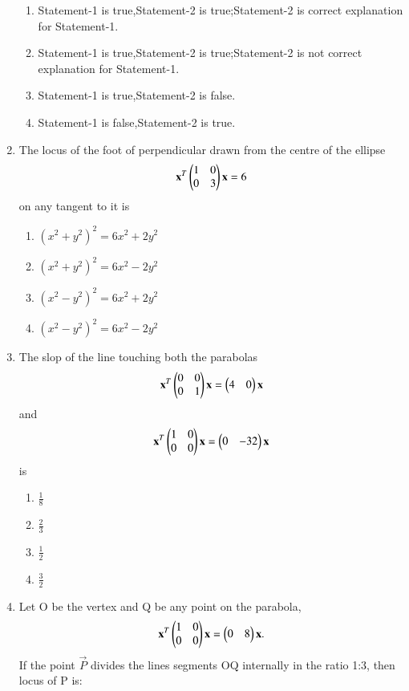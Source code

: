 \documentclass[journal,12pt,twocolumn]{IEEEtran}
\begin{document}
\begin{enumerate}[label=\arabic*]
    \begin{enumerate}
    \item Statement-1 is true,Statement-2 is true;Statement-2 is correct explanation for Statement-1.
    \item Statement-1 is true,Statement-2 is true;Statement-2 is not correct explanation for Statement-1.
    \item Statement-1 is true,Statement-2 is false.
    \item Statement-1 is false,Statement-2 is true.
    \end{enumerate}
    \item The locus of the foot of perpendicular drawn from the centre of the ellipse
    \begin{align}
    \mathbf{x}^T\begin{pmatrix}1&0\\0&3\end{pmatrix}\mathbf{x}=6
    \end{align} on any tangent to it is
    \begin{enumerate}
    \item $(x^2+y^2)^2=6x^2+2y^2$
    \item $(x^2+y^2)^2=6x^2-2y^2$
    \item $(x^2-y^2)^2=6x^2+2y^2$
    \item $(x^2-y^2)^2=6x^2-2y^2$
    \end{enumerate}
    \item The slop of the line touching both the parabolas 
    \begin{align}
    \mathbf{x}^T\begin{pmatrix}0&0\\0&1\end{pmatrix}\mathbf{x}=\begin{pmatrix}4&0\end{pmatrix}\mathbf{x}
    \end{align} and 
    \begin{align}
    \mathbf{x}^T\begin{pmatrix}1&0\\0&0\end{pmatrix}\mathbf{x}=\begin{pmatrix}0&-32\end{pmatrix}\mathbf{x}
    \end{align} is 
    \begin{enumerate}
    \item $\frac{1}{8}$
    \item $\frac{2}{3}$
    \item $\frac{1}{2}$
    \item $\frac{3}{2}$
    \end{enumerate}
    \item Let O be the vertex and Q be any point on the parabola,
    \begin{align}
    \mathbf{x}^T\begin{pmatrix}1&0\\0&0\end{pmatrix}\mathbf{x}=\begin{pmatrix}0&8\end{pmatrix}\mathbf{x}.
    \end{align} If the point $\vec{P}$ divides the lines segments OQ internally in the ratio 1:3, then locus of P is:

\end{enumerate}
\end{document}
